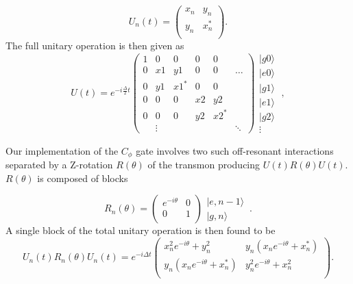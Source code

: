 \documentclass[12pt]{article}
\newcommand{\ket}[1]{\ensuremath{|{#1}\rangle}}
\begin{document}
\begin{equation}
U_n(t) = \begin{pmatrix}
x_n & y_n \\
y_n & x_n^* \\
\end{pmatrix}.
\end{equation}
The full unitary operation is then given as
\begin{equation}
\label{full_unitary}
U(t) =  e^{-i\frac{\Delta}{2}t}
\begin{pmatrix}
1 & 0&0 &0 & 0& \\
0& x1 & y1 & 0&0 & \hdots\\
0& y1 & x1^* &0 &0 & \\
0& 0& 0& x2 & y2 & \\
0&0 & 0& y2 & x2^* & \\
& \vdots & & & & \ddots
\end{pmatrix}
\begin{matrix}
     \ket{g0}\\
     \ket{e0}\\
     \ket{g1}\\
     \ket{e1}\\
     \ket{g2}\\
     \vdots
\end{matrix} \;,
\end{equation}

Our implementation of the $C_{\phi}$ gate involves two such off-resonant interactions separated by a Z-rotation $R(\theta)$ of the transmon producing $U(t)R(\theta)U(t)$. $R(\theta)$ is composed of blocks

\begin{equation}
R_n(\theta) = \begin{pmatrix}
e^{-i\theta} & 0 \\
0 & 1 \\
\end{pmatrix}
\begin{matrix}
    \ket{e, n-1}\\
    \ket{g, n}
\end{matrix}\,.
\end{equation}
A single block of the total unitary operation is then found to be
\begin{equation}
U_n(t)R_n(\theta)U_n(t) = e^{-i\Delta t}\begin{pmatrix}
x_n^2 e^{-i\theta} + y_n^2 & y_n\left(x_n e^{-i\theta}+x_n^*\right) \\
y_n\left(x_n e^{-i\theta}+x_n^*\right) & y_n^2 e^{-i\theta} + x_n^2 \\
\end{pmatrix}.
\end{equation}
\end{document}
